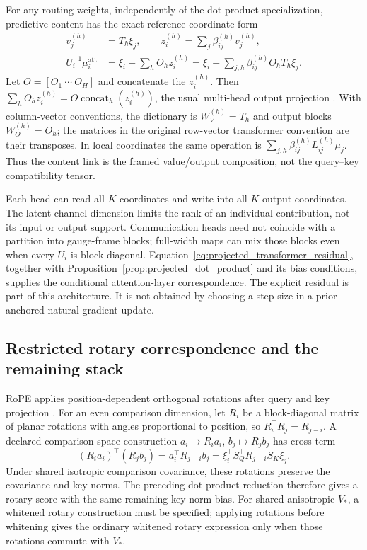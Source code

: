 \documentclass[twoside,11pt]{article}
\begin{document}
For any routing weights, independently of the dot-product specialization, predictive content has the exact reference-coordinate form
\begin{align}
v_j^{(h)}&=T_h\xi_j,\qquad
z_i^{(h)}=\sum_j\beta_{ij}^{(h)}v_j^{(h)},\\
U_i^{-1}\mu_i^{\mathrm{att}}
&=\xi_i+\sum_hO_hz_i^{(h)}
=\xi_i+\sum_{j,h}\beta_{ij}^{(h)}O_hT_h\xi_j.
\label{eq:projected_transformer_residual}
\end{align}
Let $O=[O_1\ \cdots\ O_H]$ and concatenate the $z_i^{(h)}$. Then $\sum_hO_hz_i^{(h)}=O\operatorname{concat}_h(z_i^{(h)})$, the usual multi-head output projection \citep[Sec.~3.2.2]{vaswani2017attention}. With column-vector conventions, the dictionary is $W_V^{(h)}=T_h$ and output blocks $W_O^{(h)}=O_h$; the matrices in the original row-vector transformer convention are their transposes. In local coordinates the same operation is $\sum_{j,h}\beta_{ij}^{(h)}L_{ij}^{(h)}\mu_j$. Thus the content link is the framed value/output composition, not the query--key compatibility tensor.

Each head can read all $K$ coordinates and write into all $K$ output coordinates. The latent channel dimension limits the rank of an individual contribution, not its input or output support. Communication heads need not coincide with a partition into gauge-frame blocks; full-width maps can mix those blocks even when every $U_i$ is block diagonal. Equation~\eqref{eq:projected_transformer_residual}, together with Proposition~\ref{prop:projected_dot_product} and its bias conditions, supplies the conditional attention-layer correspondence. The explicit residual is part of this architecture. It is not obtained by choosing a step size in a prior-anchored natural-gradient update.

\subsection{Restricted rotary correspondence and the remaining stack}
\label{sec:rope}

RoPE applies position-dependent orthogonal rotations after query and key projection \citep{su2024roformer}. For an even comparison dimension, let $R_i$ be a block-diagonal matrix of planar rotations with angles proportional to position, so $R_i^\top R_j=R_{j-i}$. A declared comparison-space construction $a_i\mapsto R_i a_i$, $b_j\mapsto R_jb_j$ has cross term
\begin{equation}
(R_i a_i)^\top(R_jb_j)
=a_i^\top R_{j-i}b_j
=\xi_i^\top S_Q^\top R_{j-i}S_K\xi_j.
\label{eq:projected_rope_kernel}
\end{equation}
Under shared isotropic comparison covariance, these rotations preserve the covariance and key norms. The preceding dot-product reduction therefore gives a rotary score with the same remaining key-norm bias. For shared anisotropic $V_*$, a whitened rotary construction must be specified; applying rotations before whitening gives the ordinary whitened rotary expression only when those rotations commute with $V_*$.
\end{document}
